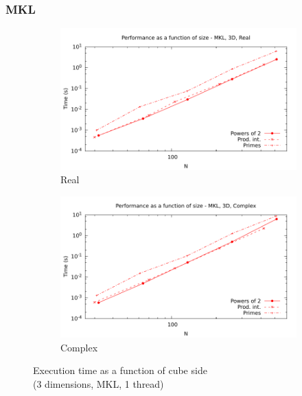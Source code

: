 \documentclass[12pt, a4paper]{article}
\begin{document}
\subsubsection{MKL}
\begin{figure}[H]
\captionsetup{width=0.8\linewidth}
\centering
\begin{subfigure}{.5\textwidth}
\centering
\includegraphics[width=.9\linewidth]{graphs/performance/3d-mkl-r.pdf}
\caption{Real}
\label{3DMKLR}
\end{subfigure}%
\begin{subfigure}{.5\textwidth}
\centering
\includegraphics[width=.9\linewidth]{graphs/performance/3d-mkl-c.pdf}
\caption{Complex}
\label{3DMKLC}
\end{subfigure}
\caption{Execution time as a function of cube side\\(3 dimensions, MKL, 1 thread)}
\label{3DMKL}
\end{figure}
\end{document}

